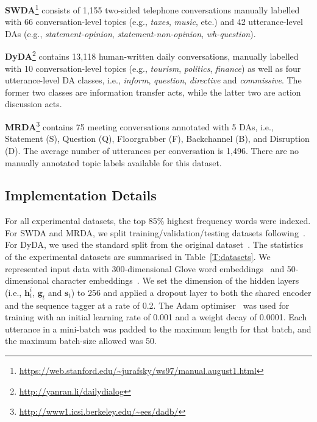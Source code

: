 \documentclass[11pt,a4paper]{article}
\begin{document}
\noindent \textbf{SWDA}\footnote{\url{https://web.stanford.edu/~jurafsky/ws97/manual.august1.html}} consists of 1,155 two-sided telephone conversations manually labelled with 66 conversation-level topics (e.g., \textit{taxes}, \textit{music}, etc.) and 42 utterance-level DAs (e.g., \textit{statement-opinion}, \textit{statement-non-opinion}, \textit{wh-question}). 


\noindent \textbf{DyDA}\footnote{\url{http://yanran.li/dailydialog}} contains 13,118 human-written daily conversations, manually labelled with 10 conversation-level topics (e.g., \textit{tourism}, \textit{politics}, \textit{finance}) as well as four utterance-level DA classes, i.e., \textit{inform}, \textit{question}, \textit{directive} and \textit{commissive}. The former two classes are information transfer acts,  while the latter two are action discussion acts. 


\noindent \textbf{MRDA}\footnote{\url{http://www1.icsi.berkeley.edu/~ees/dadb/}}  contains 75 meeting conversations annotated with 5 DAs, i.e., Statement (S), Question (Q), Floorgrabber (F), Backchannel (B), and Disruption (D). The average number of utterances per conversation is 1,496. There are no manually annotated topic labels available for this dataset. 

\subsection{Implementation Details}
For all experimental datasets, the top 85\% highest frequency words were indexed. For SWDA and MRDA, we split training/validation/testing datasets following~\cite{stolcke2000dialogue,lee2016sequential}.
For DyDA, we  used the standard split from the original dataset~\cite{li2017dailydialog}.
The statistics of the experimental datasets are summarised in Table~\ref{T:datasets}. 
We represented input data with 300-dimensional Glove word embeddings~\cite{pennington2014glove} and 50-dimensional character embeddings~\cite{ma2016end}. 
We set the dimension of the hidden layers (i.e., $\mathbf { h }_t^i$, $\mathbf{g}_t$ and $\mathbf{s}_t$) to 256 and applied a dropout layer to both the shared encoder and the sequence tagger at a rate of 0.2. The Adam optimiser~\cite{kingma2014adam} was used for training with an initial learning rate of 0.001 and a weight decay of 0.0001. 
Each utterance in a mini-batch was padded to the maximum length for that batch, and the maximum batch-size allowed was 50.
\end{document}
